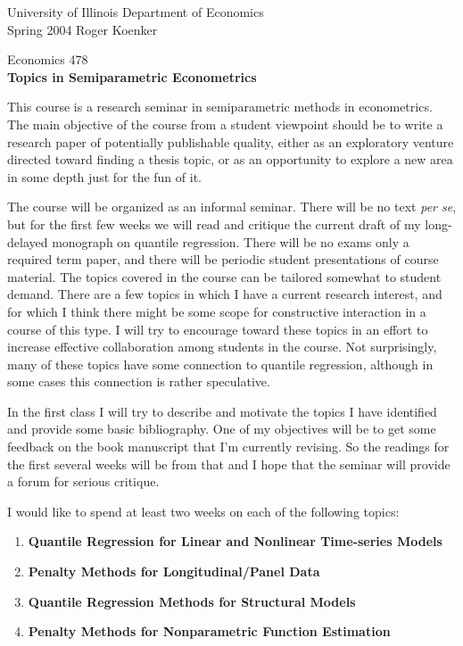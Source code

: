 




\noindent
University of Illinois \hfill Department of Economics \\
Spring 2004 \hfill Roger Koenker
\begin{center}
\large{
{ Economics 478 \\
{\bf Topics in Semiparametric Econometrics}}}
\end{center}

\vspace{3mm}
This course is a research seminar in semiparametric methods in
econometrics.  The main objective of the course from a student viewpoint
should be to write a research paper of potentially publishable quality,
either as an exploratory venture directed toward finding a thesis topic,
or as an opportunity to explore a new area in some depth just for the
fun of it.

The course will be organized as an informal seminar.  
There will be no text {\em per se}, but for the first few weeks we
will read and critique the current draft of my long-delayed monograph
on quantile regression.  There will be no exams only a required term paper,
and there will be periodic student presentations of course material.
The topics covered in the course can be tailored somewhat to student
demand.  There are a few topics in which I have a current research interest,
and for which I think there might be some scope for constructive interaction 
in a course of this type.  I will try to encourage toward these topics
in an effort to increase effective collaboration among students in the
course.  Not surprisingly, many of these topics have some connection
to quantile regression, although in some cases this connection is rather
speculative.

In the first class I will try to describe and motivate the topics I have
identified and provide some basic bibliography.  One of my objectives
will be to get some feedback on the book manuscript that I'm currently
revising.  So the readings for the first several weeks will be from
that and I hope that the seminar will provide a forum for serious critique.

I would like to spend at least two weeks on each of the following topics:

\begin{enumerate}
\item {\bf Quantile Regression for Linear and Nonlinear Time-series Models}
\item {\bf Penalty Methods for Longitudinal/Panel Data}
\item {\bf Quantile Regression Methods for Structural Models}
\item {\bf Penalty Methods for Nonparametric Function Estimation}
\end{enumerate}


